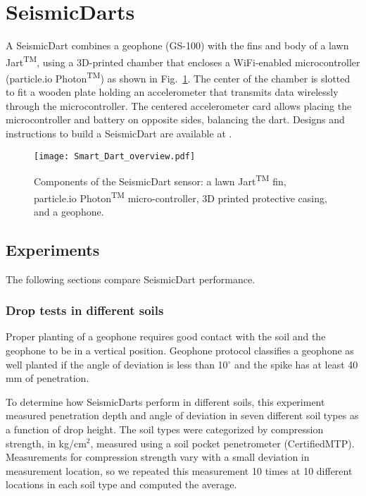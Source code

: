 \section{SeismicDarts}\label{sec:SeismicDarts}

A SeismicDart combines a geophone (GS-100) with the fins and body of a lawn Jart\textsuperscript{TM}, using a 3D-printed chamber that encloses a WiFi-enabled microcontroller (particle.io Photon\textsuperscript{TM}) as shown in Fig.~\ref{fig:Smart_Dart_overview}. 
The center of the chamber is slotted to fit a wooden plate holding an accelerometer that transmits data wirelessly through the microcontroller. 
The centered accelerometer card allows placing the microcontroller and battery on opposite sides, balancing the dart.
Designs and instructions to build a SeismicDart are available at \cite{Victor2016Thingiverse}.



\begin{figure} \centering
{\texttt{[image: Smart\_Dart\_overview.pdf]}}
\caption{Components of the SeismicDart sensor: a lawn  Jart\textsuperscript{TM} fin, particle.io Photon\textsuperscript{TM}  micro-controller, 3D printed protective casing, and a geophone.} 
\label{fig:Smart_Dart_overview}
\end{figure}

\subsection{Experiments} 
The following sections compare SeismicDart performance.
\subsubsection{ Drop tests in different soils}  


Proper planting of a geophone requires good contact with the soil and the geophone to be in a vertical position. 
Geophone protocol classifies a geophone as well planted if the angle of deviation is less than 10$^\circ$ and the spike has at least 40 mm of penetration.

To determine how SeismicDarts perform in different soils, this experiment measured penetration depth and angle of deviation in seven different soil types as a function of drop height. 
 The soil types were categorized by compression strength, in kg/cm$^2$, measured using a soil pocket penetrometer (CertifiedMTP). Measurements for compression strength vary with a small deviation in measurement location, so we repeated this measurement 10 times at 10 different locations in each soil type and computed the average.
 
